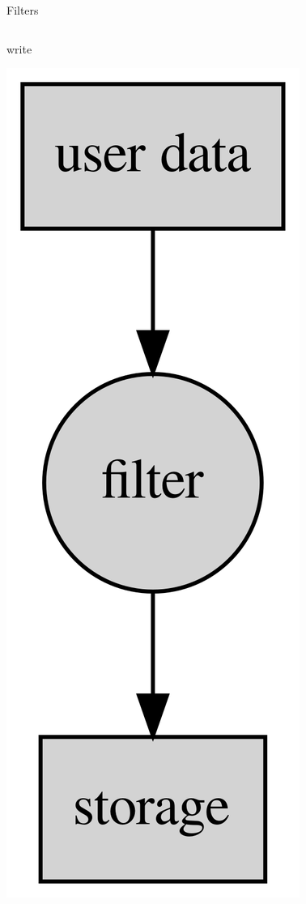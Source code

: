 \documentclass{beamer}
\begin{document}
\begin{frame}{Filters}
\begin{columns}
\begin{block}{write}
\begin{center}
        \includegraphics[height=0.75\textheight]{images/write-filter.png}
      \end{center}
    \end{block}


\end{columns}
\end{frame}
\end{document}
